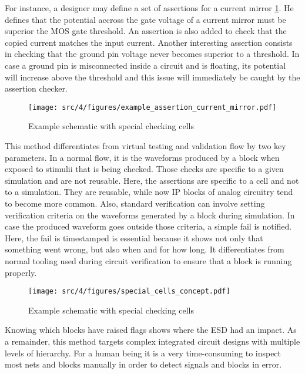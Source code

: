 For instance, a designer may define a set of assertions for a current mirror \ref{fig:ex-current-mirror-assert}.
He defines that the potential accross the gate voltage of a current mirror must be superior the MOS gate threshold.
An assertion is also added to check that the copied current matches the input current.
Another interesting assertion consists in checking that the ground pin voltage never becomes superior to a threshold.
In case a ground pin is misconnected inside a circuit and is floating, its potential will increase above the threshold and this issue will immediately be caught by the assertion checker.

\begin{figure}[!h]
  \centering
  \texttt{[image: src/4/figures/example\_assertion\_current\_mirror.pdf]}
  \caption{Example schematic with special checking cells}
  \label{fig:ex-current-mirror-assert}
\end{figure}

This method differentiates from virtual testing and validation flow by two key parameters.
In a normal flow, it is the waveforms produced by a block when exposed to stimulii that is being checked.
Those checks are specific to a given simulation and are not reusable.
Here, the assertions are specific to a cell and not to a simulation.
They are reusable, while now IP blocks of analog circuitry tend to become more common.
Also, standard verification can involve setting verification criteria on the waveforms generated by a block during simulation.
In case the produced waveform goes outside those criteria, a simple fail is notified.
Here, the fail is timestamped is essential because it shows not only that something went wrong, but also when and for how long.
It differentiates from normal tooling used during circuit verification to ensure that a block is running properly.

\begin{figure}[!h]
  \centering
  \texttt{[image: src/4/figures/special\_cells\_concept.pdf]}
  \caption{Example schematic with special checking cells}
  \label{fig:ex-special-cells}
\end{figure}

Knowing which blocks have raised flags shows where the ESD had an impact.
As a remainder, this method targets complex integrated circuit designs with multiple levels of hierarchy.
For a human being it is a very time-consuming to inspect most nets and blocks manually in order to detect signals and blocks in error.

